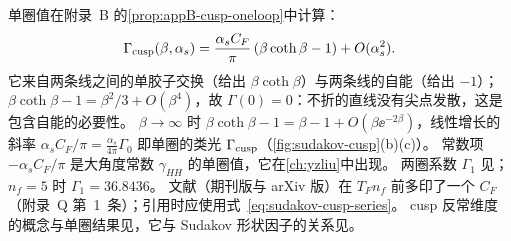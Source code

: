 单圈值在附录~B 的\cref{prop:appB-cusp-oneloop}中计算：
\begin{equation}\label{eq:sudakov-cusp-1loop}
\Gamma_{\rm cusp}(\beta,\alpha_s)=\frac{\alpha_sC_F}{\pi}\,(\beta\coth\beta-1)+O(\alpha_s^2).
\end{equation}
它来自两条线之间的单胶子交换（给出 $\beta\coth\beta$）与两条线的自能（给出 $-1$）；$\beta\coth\beta-1=\beta^2/3+O(\beta^4)$，故 $\Gamma(0)=0$：不折的直线没有尖点发散，这是包含自能的必要性。
$\beta\to\infty$ 时 $\beta\coth\beta-1=\beta-1+O(\beta\ee^{-2\beta})$，线性增长的斜率 $\alpha_sC_F/\pi=\frac{\alpha_s}{4\pi}\Gamma_0$ 即单圈的类光 $\Gamma_{\rm cusp}$（\cref{fig:sudakov-cusp}(b)(c)）。
常数项 $-\alpha_sC_F/\pi$ 是大角度常数 $\gamma_{HH}$ 的单圈值，它在\cref{ch:yzliu}中出现。
两圈系数 $\Gamma_1$ 见\cite{KorchemskyRadyushkin1987}；$n_f=5$ 时 $\Gamma_1=36.8436$。
文献\cite[式~(A.10)]{BecherSchwartz2008}（期刊版与 arXiv 版）在 $T_Fn_f$ 前多印了一个 $C_F$（附录~Q 第~1~条）；引用时应使用式~\eqref{eq:sudakov-cusp-series}。
cusp 反常维度的概念与单圈结果见\cite{Polyakov1980,BrandtNeriSato1981,KorchemskyRadyushkin1987}，它与 Sudakov 形状因子的关系见\cite{Korchemsky1989}。

